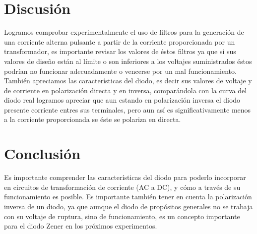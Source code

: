 \documentclass{article}
\begin{document}
\section{Discusión}

Logramos comprobar experimentalmente el uso de filtros para la generación de una corriente alterna pulsante a partir de la corriente proporcionada por un transformador, es importante revisar los valores de éstos filtros ya que si sus valores de diseño están al límite o son inferiores a los voltajes suministrados éstos podrían no funcionar adecuadamente o vencerse por un mal funcionamiento.\\

También apreciamos las características del diodo, es decir sus valores de voltaje y de corriente en polarización directa y en inversa, comparándola con la curva del diodo real logramos apreciar que aun estando en polarización inversa el diodo presente corriente entres sus terminales, pero aun así es significativamente menos a la corriente proporcionada se éste se polariza en directa. \\

\section{Conclusión}

Es importante comprender las características del diodo para poderlo incorporar en circuitos de transformación de corriente (AC a DC), y cómo a través de su funcionamiento es posible. Es importante también tener en cuenta la polarización inversa de un diodo, ya que aunque el diodo de propósitos generales no se trabaja con su voltaje de ruptura, sino de funcionamiento, es un concepto importante para el diodo Zener en los próximos experimentos.\\







\end{document}
